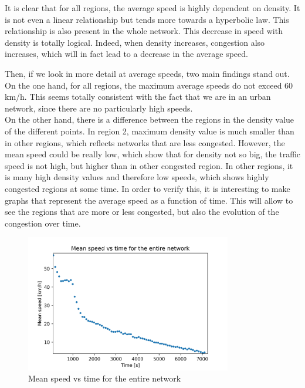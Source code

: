 \documentclass[a4paper, 12pt,oneside]{article}
\begin{document}
It is clear that for all regions, the average speed is highly dependent on density.  It is not even a linear relationship but tends more towards a hyperbolic law. This relationship is also present in the whole network. This decrease in speed with density is totally logical. Indeed, when density increases, congestion also increases, which will in fact lead to a decrease in the average speed.

\bigbreak
Then, if we look in more detail at average speeds, two main findings stand out.\\
On the one hand, for all regions, the maximum average speeds do not exceed 60 km/h. This seems totally consistent with the fact that we are in an urban network, since there are no particularly high speeds.\\
On the other hand, there is a difference between the regions in the density value of the different points. In region 2, maximum density value is much smaller than in other regions, which reflects networks that are less congested. However, the mean speed could be really low, which show that for density not so big, the traffic speed is not high, but higher than in other congested region. In other regions, it is many high density values and therefore low speeds, which shows highly congested regions at some time.
\bigbreak
In order to verify this, it is interesting to make graphs that represent the average speed as a function of time. This will allow to see the regions that are more or less congested, but also the evolution of the congestion over time.
\bigbreak
\begin{figure}[H]
    \begin{center}
        \includegraphics[width=9cm]{Images/Mean speed vs time for the entire network.png}
        \caption{Mean speed vs time for the entire network}
        \label{Mean speed vs time for the entire network}
    \end{center}
\end{figure}
\end{document}
